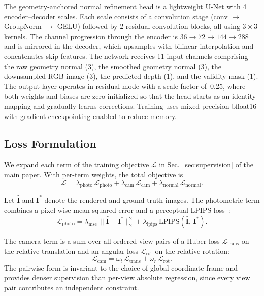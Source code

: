 The geometry-anchored normal refinement head is a lightweight U-Net with 4 encoder--decoder scales. Each scale consists of a convolution stage (conv $\to$ GroupNorm $\to$ GELU) followed by 2 residual convolution blocks, all using $3\!\times\!3$ kernels. The channel progression through the encoder is $36 \to 72 \to 144 \to 288$ and is mirrored in the decoder, which upsamples with bilinear interpolation and concatenates skip features. The network receives 11 input channels comprising the raw geometry normal (3), the smoothed geometry normal (3), the downsampled RGB image (3), the predicted depth (1), and the validity mask (1). The output layer operates in residual mode with a scale factor of~0.25, where both weights and biases are zero-initialized so that the head starts as an identity mapping and gradually learns corrections. Training uses mixed-precision bfloat16 with gradient checkpointing enabled to reduce memory.

\subsection{Loss Formulation}
\label{sec:app_loss}

We expand each term of the training objective $\mathcal{L}$ in Sec.~\ref{sec:supervision} of the main paper. With per-term weights, the total objective is
\begin{equation}
    \mathcal{L} = \lambda_{\mathrm{photo}}\,\mathcal{L}_{\mathrm{photo}} + \lambda_{\mathrm{cam}}\,\mathcal{L}_{\mathrm{cam}} + \lambda_{\mathrm{normal}}\,\mathcal{L}_{\mathrm{normal}}.
    \label{eq:app_total}
\end{equation}

Let $\hat{\mathbf{I}}$ and $\mathbf{I}^{*}$ denote the rendered and ground-truth images. The photometric term combines a pixel-wise mean-squared error and a perceptual LPIPS loss~\citep{zhang2018unreasonable}:
\begin{equation}
    \mathcal{L}_{\mathrm{photo}} = \lambda_{\mathrm{mse}}\,\bigl\|\hat{\mathbf{I}} - \mathbf{I}^{*}\bigr\|_2^2 + \lambda_{\mathrm{lpips}}\,\mathrm{LPIPS}(\hat{\mathbf{I}},\,\mathbf{I}^{*}).
    \label{eq:app_photo}
\end{equation}

The camera term is a sum over all ordered view pairs of a Huber loss $\mathcal{L}_{\mathrm{trans}}$ on the relative translation and an angular loss $\mathcal{L}_{\mathrm{rot}}$ on the relative rotation:
\begin{equation}
    \mathcal{L}_{\mathrm{cam}} = \omega_t\,\mathcal{L}_{\mathrm{trans}} + \omega_r\,\mathcal{L}_{\mathrm{rot}}.
    \label{eq:app_cam}
\end{equation}
The pairwise form is invariant to the choice of global coordinate frame and provides denser supervision than per-view absolute regression, since every view pair contributes an independent constraint.

